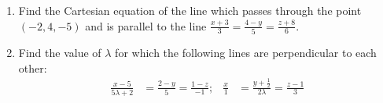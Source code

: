 
\begin{enumerate}
\item Find the Cartesian equation of the line which passes through the point $(-2,4,-5)$ and is parallel to the line $\frac{x+3}{3}=\frac{4-y}{5}=\frac{z+8}{6}$.
\item Find the value of $\lambda$ for which the  following lines are perpendicular to each other:  
\begin{align*}                                                     
	\frac{x -5}{5\lambda + 2} &= \frac{2 - y}{5} = \frac{1 - z}{- 1}; & \frac{x}{1} &= \frac{y + \frac{1}{2}}{2\lambda} = \frac{z - 1}{3}                                                
\end{align*}
\end{enumerate}